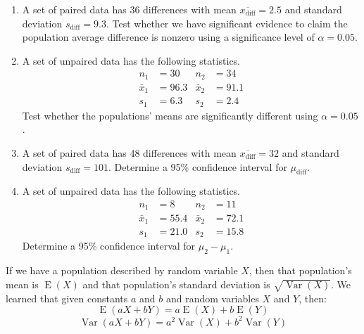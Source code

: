\documentclass[12pt,letterpaper]{article}
\DeclareMathOperator{\E}{E}
\DeclareMathOperator{\Var}{Var}
\begin{document}
\begin{enumerate}

\item A set of paired data has 36 differences with mean $\overline{x_\text{diff}} = 2.5$ and standard deviation $s_\text{diff} = 9.3$. Test whether we have significant evidence to claim the population average difference is nonzero using a significance level of $\alpha=0.05$.
\vfill


\item A set of unpaired data has the following statistics.
\begin{align*}
n_1 &= 30 & n_2 &= 34 \\
\bar{x}_1 &= 96.3 & \bar{x}_2 &= 91.1 \\
s_1 &= 6.3 & s_2 &= 2.4
\end{align*}
Test whether the populations' means are significantly different using $\alpha=0.05$.
\vfill

\newpage

\item A set of paired data has 48 differences with mean $\overline{x_\text{diff}} = 32$ and standard deviation $s_\text{diff} = 101$. Determine a 95\% confidence interval for $\mu_\text{diff}$.
\vfill


\item A set of unpaired data has the following statistics.
\begin{align*}
n_1 &= 8 & n_2 &= 11 \\
\bar{x}_1 &= 55.4 & \bar{x}_2 &= 72.1 \\
s_1 &= 21.0 & s_2 &= 15.8
\end{align*}
Determine a 95\% confidence interval for $\mu_2-\mu_1$.
\vfill

\newpage

\end{enumerate}
If we have a population described by random variable $X$, then that population's mean is $\E(X)$ and that population's standard deviation is $\sqrt{\Var(X)}$. We learned that given constants $a$ and $b$ and random variables $X$ and $Y$, then:
$$\E(aX+bY) = a\E(X)+b\E(Y) $$ 
$$\Var(aX+bY) = a^2\Var(X)+b^2\Var(Y) $$ 
\end{document}
